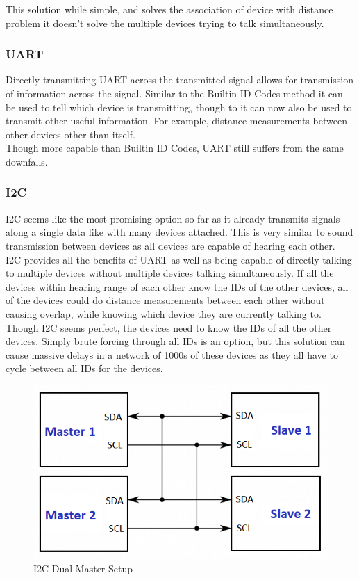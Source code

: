 \documentclass{article}
\begin{document}
This solution while simple, and solves the association of device with distance problem it doesn't solve the multiple devices trying to talk simultaneously.

\subsubsection{UART}
Directly transmitting UART across the transmitted signal allows for transmission of information across the signal. Similar to the Builtin ID Codes method it can be used to tell which device is transmitting, though to it can now also be used to transmit other useful information. For example, distance measurements between other devices other than itself.\\

Though more capable than Builtin ID Codes, UART still suffers from the same downfalls.

\subsubsection{I2C}
I2C seems like the most promising option so far as it already transmits signals along a single data like with many devices attached. This is very similar to sound transmission between devices as all devices are capable of hearing each other.\\

I2C provides all the benefits of UART as well as being capable of directly talking to multiple devices without multiple devices talking simultaneously. If all the devices within hearing range of each other know the IDs of the other devices, all of the devices could do distance measurements between each other without causing overlap, while knowing which device they are currently talking to.\\

Though I2C seems perfect, the devices need to know the IDs of all the other devices. Simply brute forcing through all IDs is an option, but this solution can cause massive delays in a network of 1000s of these devices as they all have to cycle between all IDs for the devices.

\begin{figure}[h!]
	\includegraphics[width=\textwidth]{I2C-Dual-Master}
	\caption{I2C Dual Master Setup}
	\label{fig:I2CDMast}
\end{figure}
\end{document}
